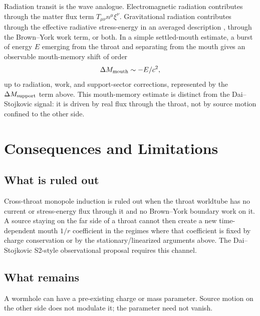 \documentclass[aps,prd,10pt,onecolumn,nofootinbib,superscriptaddress,floatfix]{revtex4-2}
\begin{document}
Radiation transit is the wave analogue.  Electromagnetic
radiation contributes through the matter flux term
$T_{\mu\nu}n^\mu\xi^\nu$.  Gravitational radiation contributes through the
effective radiative stress-energy in an averaged description
\cite{Isaacson1968EffectiveStressTensor}, through the Brown--York work term, or
both.  In a simple settled-mouth estimate, a burst of energy $E$ emerging from
the throat and separating from the mouth gives an observable mouth-memory shift
of order
\begin{equation}
  \Delta M_{\rm mouth}\sim -E/c^2,
\end{equation}
up to radiation, work, and support-sector corrections, represented by the
$\Delta M_{\rm support}$ term above.  This
mouth-memory estimate is distinct from the Dai--Stojkovic signal: it is
driven by real flux through the throat, not by source motion confined to the
other side.

\section{Consequences and Limitations}
\label{sec:consequences}

\subsection{What is ruled out}

Cross-throat monopole induction is ruled out when the throat worldtube has
no current or stress-energy flux through it and no Brown--York boundary work
on it.  A source staying on the far side of a throat cannot then create a new
time-dependent mouth $1/r$ coefficient in the regimes where that coefficient
is fixed by charge conservation or by the stationary/linearized arguments
above.
The Dai--Stojkovic S2-style observational proposal requires this channel.

\subsection{What remains}

A wormhole can have a pre-existing charge or mass parameter.  Source motion on
the other side does not modulate it; the parameter need not vanish.
\end{document}
